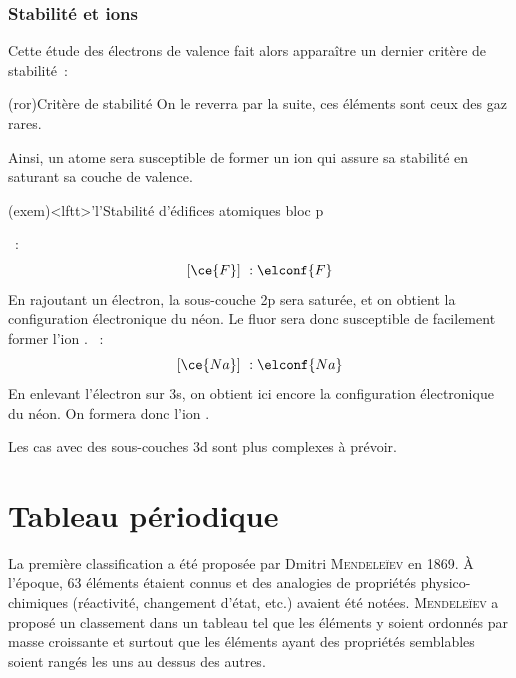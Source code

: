 \documentclass[../../main/main.tex]{subfiles}
\begin{document}
\subsubsection{Stabilité et ions}

Cette étude des électrons de valence fait alors apparaître un dernier critère de
stabilité~:
\vspace{-10pt}
\begin{tcb*}(ror){Critère de stabilité}
	\vspace{-15pt}
	On le reverra par la suite, ces éléments sont ceux des gaz rares.
\end{tcb*}

Ainsi, un atome sera susceptible de former un ion qui assure sa stabilité en
saturant sa couche de valence.

\begin{tcb*}(exem)<lftt>'l'{Stabilité d'édifices atomiques bloc p}
	\begin{itemize}[label=$\diamond$, leftmargin=20pt]
		~:
		\[[\ce{F}]~: \elconf{F}\]
		En rajoutant un électron, la sous-couche 2p sera saturée, et on
		obtient la configuration électronique du néon. Le fluor sera donc
		susceptible de facilement former l'ion .
		~:
		\[[\ce{Na}]~: \elconf{Na}\]
		En enlevant l'électron sur 3s, on obtient ici encore la
		configuration électronique du néon. On formera donc l'ion .
	\end{itemize}
\end{tcb*}

Les cas avec des sous-couches 3d sont plus complexes à prévoir.

\section{Tableau périodique}

La première classification a été proposée par Dmitri \textsc{Mendeleïev} en
1869. À l'époque, 63 éléments étaient connus et des analogies de propriétés
physico-chimiques (réactivité, changement d'état, etc.) avaient été notées.
\textsc{Mendeleïev} a proposé un classement dans un tableau tel que les éléments
y soient ordonnés par masse croissante et surtout que les éléments ayant des
propriétés semblables soient rangés les uns au dessus des autres.
\end{document}
